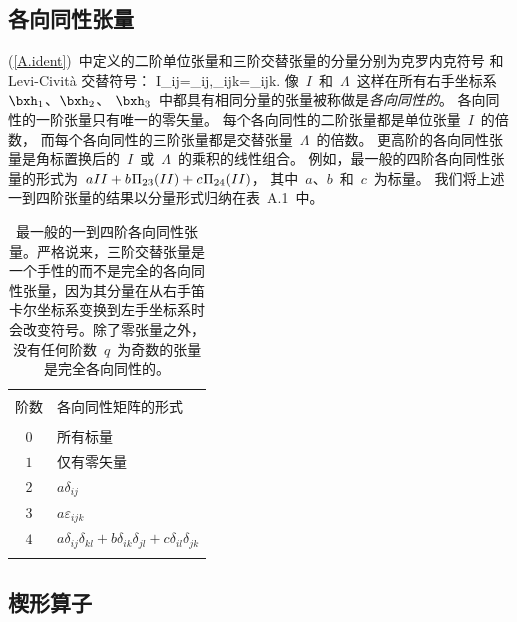 \subsection{各向同性张量}
%
%
\label{A.sec.iso}

(\ref{A.ident})~中定义的二阶单位张量和三阶交替张量的分量分别为克罗内克符号
和 Levi-Civit\`{a} 交替符号：
%
%
%
\eq
I_{ij}=\delta_{ij},\qquad \Lambda_{ijk}=\varepsilon_{ijk}.
\en
像~$I$~和~$\Lambda$~这样在所有右手坐标系~$\bxh_1$、$\bxh_2$、 $\bxh_3$~中都具有相同分量的张量被称做是{\em 各向同性的\/}。
各向同性的一阶张量只有唯一的零矢量。
每个各向同性的二阶张量都是单位张量~$I$~的倍数，
而每个各向同性的三阶张量都是交替张量~$\Lambda$~的倍数。
更高阶的各向同性张量是角标置换后的~$I$~或~$\Lambda$~的乘积的线性组合。
例如，最一般的四阶各向同性张量的形式为~$aII+b\hspace{0.2 mm}\Pi_{23}(II)+c\hspace{0.2 mm}\Pi_{24}(II)$，
其中~$a$、$b$~和~$c$~为标量。
我们将上述一到四阶张量的结果以分量形式归纳在表~A.1~中。
\begin{table}[h]
\centering
\begin{tabular}{|c|l|} \hline
& \\
阶数 & 各向同性矩阵的形式
& \\ \hline
& \\
$0$ & 所有标量 \\
$1$ & 仅有零矢量 \\
$2$ & $a\delta_{ij}$ \\
$3$ & $a\varepsilon_{ijk}$ \\
$4$ & $a\delta_{ij}\delta_{kl}+b\delta_{ik}\delta_{jl}
+c\delta_{il}\delta_{jk}$ \\
& \\ \hline
\end{tabular}
\caption[isoten]{
最一般的一到四阶各向同性张量。严格说来，三阶交替张量是一个手性的而不是完全的各向同性张量，因为其分量在从右手笛卡尔坐标系变换到左手坐标系时会改变符号。除了零张量之外，没有任何阶数~$q$~为奇数的张量是完全各向同性的。}
\end{table}
%
%

\subsection{楔形算子}
%
%
\label{sec.A.1.6}

